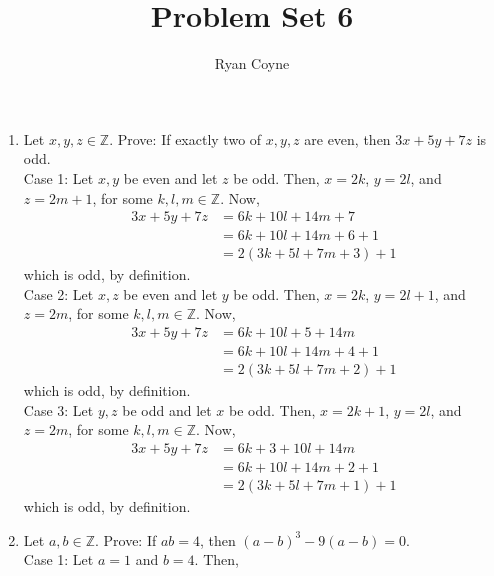 \documentclass[12pt]{article}
\newcommand{\Z}{\mathbb{Z}}
\begin{document}
    \title{Problem Set 6}
    \author{Ryan Coyne}
    \maketitle

    \begin{enumerate}
        \item Let \(x,y,z\in \mathbb{Z}\). Prove: If exactly two of \(x,y,z\) are even, then \(3x+5y+7z\) is odd.\\ Case 1: Let \(x, y\) be even and let \(z\) be odd. Then, \(x=2k\), \(y=2l\), and \(z = 2m+1\), for some \(k, l, m\in\Z\). Now, \begin{equation*}
            \begin{split}
                3x+5y+7z &= 6k + 10l + 14m+7\\
                &=6k+10l+14m+6+1\\
                &= 2(3k+5l+7m+3)+1
            \end{split}
        \end{equation*}
        which is odd, by definition.\\
        Case 2: Let \(x,z\) be even and let \(y\) be odd. Then, \(x=2k\), \(y=2l+1\), and \(z = 2m\), for some \(k, l, m\in\Z\). Now, \begin{equation*}
            \begin{split}
                3x+5y+7z &= 6k + 10l + 5 + 14m\\
                &=6k+10l+14m+4+1\\
                &= 2(3k+5l+7m+2)+1
            \end{split}
        \end{equation*}
        which is odd, by definition.\\
        Case 3: Let \(y,z\) be odd and let \(x\) be odd. Then, \(x=2k+1\), \(y=2l\), and \(z = 2m\), for some \(k, l, m\in\Z\). Now, \begin{equation*}
            \begin{split}
                3x+5y+7z &= 6k + 3 + 10l + 14m\\
                &=6k+10l+14m+2+1\\
                &= 2(3k+5l+7m+1)+1
            \end{split}
        \end{equation*}
        which is odd, by definition.\pagebreak
        \item Let \(a,b\in\Z\). Prove: If \(ab=4\), then \((a-b)^3-9(a-b)=0\).\\ Case 1: Let \(a=1\) and \(b=4\). Then, \begin{equation*}

\end{equation*}
\end{enumerate}
\end{document}
